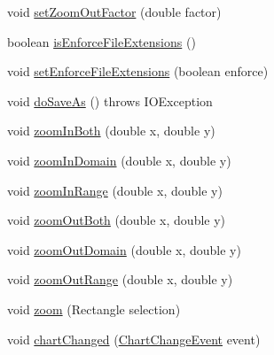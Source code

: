 \begin{DoxyCompactItemize}
\item 
void \mbox{\hyperlink{classorg_1_1jfree_1_1experimental_1_1chart_1_1swt_1_1_chart_composite_a084745d3f14bf7149be79109f326aec7}{set\+Zoom\+Out\+Factor}} (double factor)
\item 
boolean \mbox{\hyperlink{classorg_1_1jfree_1_1experimental_1_1chart_1_1swt_1_1_chart_composite_a10a381866b71ea3fd4b046533882fa59}{is\+Enforce\+File\+Extensions}} ()
\item 
void \mbox{\hyperlink{classorg_1_1jfree_1_1experimental_1_1chart_1_1swt_1_1_chart_composite_a0d18bc0ed9c74543ddbc9c829f0eaf95}{set\+Enforce\+File\+Extensions}} (boolean enforce)
\item 
void \mbox{\hyperlink{classorg_1_1jfree_1_1experimental_1_1chart_1_1swt_1_1_chart_composite_a04ac5a5c6cf7a6cbc109939779c9548b}{do\+Save\+As}} ()  throws I\+O\+Exception 
\item 
void \mbox{\hyperlink{classorg_1_1jfree_1_1experimental_1_1chart_1_1swt_1_1_chart_composite_a0e7d687a6c413ad6daabeccb57afad60}{zoom\+In\+Both}} (double x, double y)
\item 
void \mbox{\hyperlink{classorg_1_1jfree_1_1experimental_1_1chart_1_1swt_1_1_chart_composite_ac4971a312b9a53f5648cb2d9864ef822}{zoom\+In\+Domain}} (double x, double y)
\item 
void \mbox{\hyperlink{classorg_1_1jfree_1_1experimental_1_1chart_1_1swt_1_1_chart_composite_a2a28cc8870dd2036b6f63860f1bf26b7}{zoom\+In\+Range}} (double x, double y)
\item 
void \mbox{\hyperlink{classorg_1_1jfree_1_1experimental_1_1chart_1_1swt_1_1_chart_composite_a455458e3bf5718afb399990c0506f27d}{zoom\+Out\+Both}} (double x, double y)
\item 
void \mbox{\hyperlink{classorg_1_1jfree_1_1experimental_1_1chart_1_1swt_1_1_chart_composite_a7d9320ff86f75dcf741a625be457c1fc}{zoom\+Out\+Domain}} (double x, double y)
\item 
void \mbox{\hyperlink{classorg_1_1jfree_1_1experimental_1_1chart_1_1swt_1_1_chart_composite_acb3903f67eb45789bd73c3ac715554a8}{zoom\+Out\+Range}} (double x, double y)
\item 
void \mbox{\hyperlink{classorg_1_1jfree_1_1experimental_1_1chart_1_1swt_1_1_chart_composite_a333608aa2d2a3bc356c79c5bac9462ec}{zoom}} (Rectangle selection)
\item 
void \mbox{\hyperlink{classorg_1_1jfree_1_1experimental_1_1chart_1_1swt_1_1_chart_composite_a356b3e52ea0215e75ea2d9a248fd25ee}{chart\+Changed}} (\mbox{\hyperlink{classorg_1_1jfree_1_1chart_1_1event_1_1_chart_change_event}{Chart\+Change\+Event}} event)

\end{DoxyCompactItemize}
